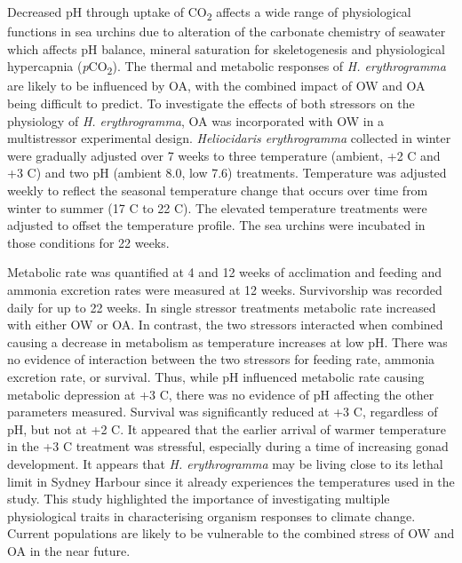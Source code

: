 Decreased pH through uptake of CO\textsubscript{2} affects a wide range of physiological functions in sea urchins due to alteration of the carbonate chemistry of seawater which affects pH balance, mineral saturation for skeletogenesis and physiological hypercapnia (\textit{p}CO\textsubscript{2}).
The thermal and metabolic responses of \textit{H. erythrogramma} are likely to be influenced by OA, with the combined impact of OW and OA being difficult to predict.
To investigate the effects of both stressors on the physiology of \textit{H. erythrogramma}, OA was incorporated with OW in a multistressor experimental design.
\textit{Heliocidaris erythrogramma} collected in winter were gradually adjusted over 7 weeks to three temperature (ambient, +2 \degree C and +3 \degree C) and two pH (ambient 8.0, low 7.6) treatments.
Temperature was adjusted weekly to reflect the seasonal temperature change that occurs over time from winter to summer (17 \degree C to 22 \degree C). 
The elevated temperature treatments were adjusted to offset the temperature profile.
The sea urchins were incubated in those conditions for 22 weeks.

Metabolic rate was quantified at 4 and 12 weeks of acclimation and feeding and ammonia excretion rates were measured at 12 weeks. 
Survivorship was recorded daily for up to 22 weeks.
In single stressor treatments metabolic rate increased with either OW or OA.
In contrast, the two stressors interacted when combined causing a decrease in metabolism as temperature increases at low pH.
There was no evidence of interaction between the two stressors for feeding rate, ammonia excretion rate, or survival. 
Thus, while pH influenced metabolic rate causing metabolic depression at +3 \degree C, there was no evidence of pH affecting the other parameters measured. 
Survival was significantly reduced at +3 \degree C, regardless of pH, but not at +2 \degree C. 
It appeared that the earlier arrival of warmer temperature in the +3 \degree C treatment was stressful, especially during a time of increasing gonad development. 
It appears that \textit{H. erythrogramma} may be living close to its lethal limit in Sydney Harbour since it already experiences the temperatures used in the study.
This study highlighted the importance of investigating multiple physiological traits in characterising organism responses to climate change.
Current populations are likely to be vulnerable to the combined stress of OW and OA in the near future.

